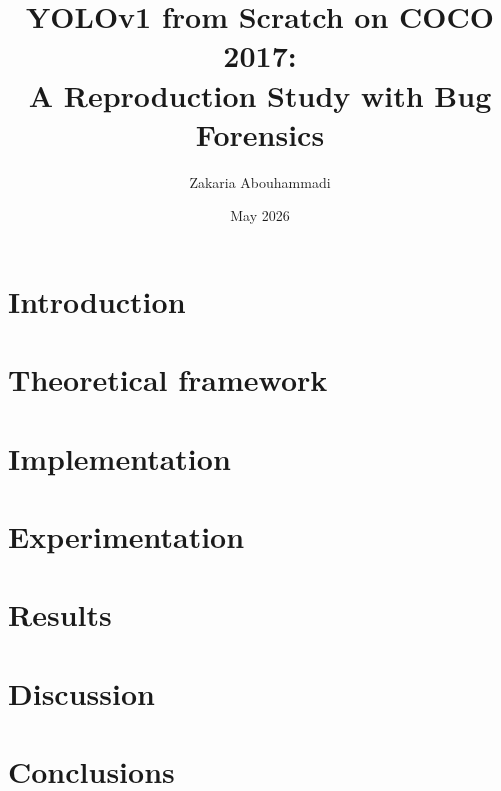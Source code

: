 \documentclass[11pt,a4paper]{article}
\title{\textbf{YOLOv1 from Scratch on COCO 2017:\\
A Reproduction Study with Bug Forensics}}
\author[1]{Zakaria Abouhammadi}
\affil[1]{Universitat de Val\`encia, Escola T\`ecnica Superior d'Enginyeria}
\date{May 2026}
\begin{document}
\maketitle

\begin{abstract}

\end{abstract}

\section{Introduction}


\section{Theoretical framework}


\section{Implementation}


\section{Experimentation}
\label{sec:experimentation}


\section{Results}
\label{sec:results}


\section{Discussion}


\section{Conclusions}



\end{document}

